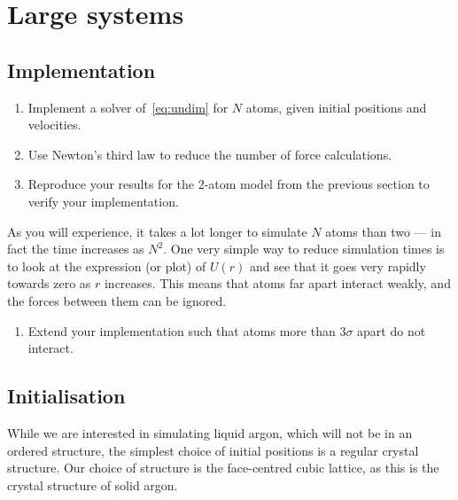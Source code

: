 \documentclass[11pt,british,a4paper]{report}
\begin{document}
\section{Large systems}

\subsection{Implementation}
\begin{enumerate}[label=\roman*.]
    \item Implement a solver of~\vref{eq:undim} for \(N\) atoms, given initial positions and velocities.
    \item Use Newton's third law to reduce the number of force calculations.
    \item Reproduce your results for the 2-atom model from the previous section to verify your implementation.
\end{enumerate}
As you will experience, it takes a lot longer to simulate \(N\) atoms than two --- in fact the time increases as \(N^2\). One very simple way to reduce simulation times is to look at the expression (or plot) of \(U(r)\) and see that it goes very rapidly towards zero as \(r\) increases. This means that atoms far apart interact weakly, and the forces between them can be ignored.

\begin{enumerate}[label=\roman*., resume]
    \item Extend your implementation such that atoms more than \(3\sigma\) apart do not interact.
    
\end{enumerate}

\subsection{Initialisation}
While we are interested in simulating liquid argon, which will not be in an ordered structure, the simplest choice of initial positions is a regular crystal structure. Our choice of structure is the face-centred cubic lattice, as this is the crystal structure of solid argon.
\end{document}
